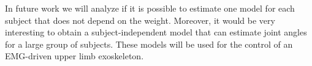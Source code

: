 \documentclass[letterpaper, 10 pt, conference]{ieeeconf}  %
\begin{document}
In future work we will analyze if it is possible to estimate one model for each subject that does not depend on the weight. Moreover, it would be very interesting to obtain a subject-independent model that can estimate joint angles for a large group of subjects. These models will be used for the control of an EMG-driven upper limb exoskeleton.









\end{document}
